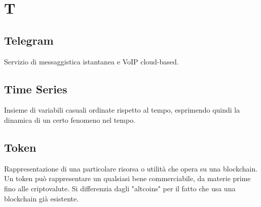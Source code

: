 \section*{T}
\subsection*{Telegram}
Servizio di messaggistica istantanea  e VoIP cloud-based.

\subsection*{Time Series}
Insieme di variabili casuali ordinate rispetto al tempo, esprimendo quindi la dinamica di un certo fenomeno nel tempo.

\subsection*{Token}
Rappresentazione di una particolare risorsa o utilità che opera su una blockchain\glo. Un token può rappresentare un qualsiasi bene commerciabile, da materie prime fino alle criptovalute. Si differenzia dagli "altcoins" per il fatto che usa una blockchain già esistente.

